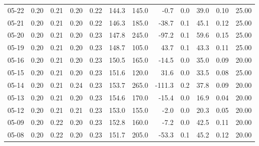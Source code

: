\begin{threeparttable}
{\begin{tabular}{lrrrrrrrrrrr}
  05-22 &          0.20 &          0.21 &          0.20 &        0.22 &               144.3 &               145.0 &       -0.7 &                 0.0 &             39.0 &            0.10 &                  25.00 \\
  05-21 &          0.20 &          0.21 &          0.20 &        0.22 &               146.3 &               185.0 &      -38.7 &                 0.1 &             45.1 &            0.12 &                  25.00 \\
  05-20 &          0.20 &          0.21 &          0.20 &        0.23 &               147.8 &               245.0 &      -97.2 &                 0.1 &             59.6 &            0.15 &                  25.00 \\
  05-19 &          0.20 &          0.21 &          0.20 &        0.23 &               148.7 &               105.0 &       43.7 &                 0.1 &             43.3 &            0.11 &                  25.00 \\
  05-16 &          0.20 &          0.21 &          0.20 &        0.23 &               150.5 &               165.0 &      -14.5 &                 0.0 &             35.0 &            0.09 &                  20.00 \\
  05-15 &          0.20 &          0.21 &          0.20 &        0.23 &               151.6 &               120.0 &       31.6 &                 0.0 &             33.5 &            0.08 &                  25.00 \\
  05-14 &          0.20 &          0.21 &          0.24 &        0.23 &               153.7 &               265.0 &     -111.3 &                 0.2 &             37.8 &            0.09 &                  20.00 \\
  05-13 &          0.20 &          0.21 &          0.20 &        0.23 &               154.6 &               170.0 &      -15.4 &                 0.0 &             16.9 &            0.04 &                  20.00 \\
  05-12 &          0.20 &          0.21 &          0.21 &        0.23 &               153.0 &               155.0 &       -2.0 &                 0.0 &             20.3 &            0.05 &                  20.00 \\
  05-09 &          0.20 &          0.22 &          0.20 &        0.23 &               152.8 &               160.0 &       -7.2 &                 0.0 &             42.5 &            0.11 &                  20.00 \\
  05-08 &          0.20 &          0.22 &          0.20 &        0.23 &               151.7 &               205.0 &      -53.3 &                 0.1 &             45.2 &            0.12 &                  20.00 \\

\end{tabular}}
\end{threeparttable}
